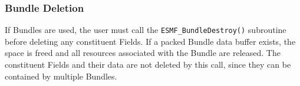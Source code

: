 \subsubsection{Bundle Deletion}

If Bundles are used, the user must call the 
{\tt ESMF\_BundleDestroy()} subroutine before deleting any constituent
Fields.  If a packed Bundle data buffer exists, the space is
freed and all resources associated with the Bundle are released.
The constituent Fields and their data are not deleted by this call, 
since they can be contained by multiple Bundles.
